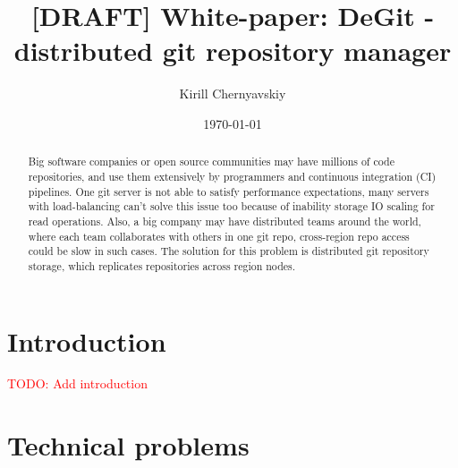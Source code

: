 \documentclass[nonacm=true]{acmart}
\date{\small\today}
\title[DeGit white paper]{[DRAFT] White-paper: DeGit - distributed git repository manager}
\author{Kirill Chernyavskiy}
\newcommand{\todo}[1]{\textcolor{red}{TODO: #1}}
\begin{document}
\raggedbottom

\begin{abstract}
  Big software companies or open source communities 
  may have millions of code repositories,
  and use them extensively by programmers and continuous integration (CI) pipelines.
  One git server is not able to satisfy performance expectations,
  many servers with load-balancing can't solve this issue too because
  of inability storage IO scaling for read operations.
  Also, a big company may have distributed teams around the world,
  where each team collaborates with others in one git repo,
  cross-region repo access could be slow in such cases.
  The solution for this problem is distributed git repository storage,
  which replicates repositories across region nodes.
\end{abstract}

\def\acmBooktitle#1{\gdef\@acmBooktitle{#1}}
\acmBooktitle{Proceedings of \acmConference@name
       \ifx\acmConference@name\acmConference@shortname\else
         \ (\acmConference@shortname)\fi}


\maketitle

\section{Introduction}

\todo{Add introduction}

\section{Technical problems}
\end{document}
